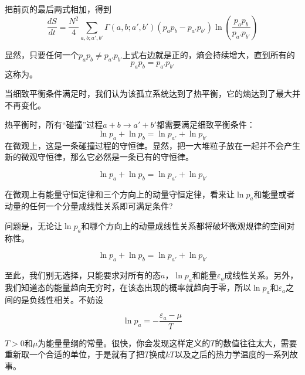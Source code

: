 \documentclass[CJK]{beamer}
\begin{document}
\begin{frame}
\bch
{\small
\bitem
\item{把前页的最后两式相加，得到
$$\frac{d S}{dt} =  \frac{N^2}{4} \sum_{a, b; a', b'}\Gamma(a, b; a', b') \left(p_ap_b - p_{a'}p_{b'}\right)\ln(\frac{p_ap_b}{p_{a'}p_{b'}})    $$
}
\eitem

显然，只要任何一个$p_ap_b\ne p_{a'}p_{b'}$上式右边就是正的，熵会持续增大，直到{\blue 所有的 
$$p_ap_b = p_{a'}p_{b'}$$}
这称为{。}

当细致平衡条件满足时，我们认为该孤立系统达到了热平衡，它的熵达到了最大并不再变化。
}

\ech
\end{frame}

\begin{frame}
\bch
{
热平衡时，所有“碰撞”过程$a+b \rightarrow a'+b'$都需要满足细致平衡条件：
$$\ln p_a + \ln p_b = \ln p_{a'} + \ln p_{b'}$$
在微观上，这是一条碰撞过程的守恒律。显然，把一大堆粒子放在一起并不会产生新的微观守恒律，那么它必然是一条已有的守恒律。

}
\ech
\end{frame}

\begin{frame}
\bch

$$\ln p_a + \ln p_b = \ln p_{a'} + \ln p_{b'}$$

\skipline

在微观上有能量守恒定律和三个方向上的动量守恒定律，看来让$\ln p_a$和能量或者动量的任何一个分量成线性关系即可满足条件?

\skipline

问题是，无论让$\ln p_a$和哪个方向上的动量成线性关系都将破坏{\blue 微观规律的空间对称性}。


\ech
\end{frame}

\begin{frame}
\bch

$$\ln p_a + \ln p_b = \ln p_{a'} + \ln p_{b'}$$

\skipline

至此，我们别无选择，只能要求对所有的态$a$，$\ln p_a$和能量$\varepsilon_a$成线性关系。另外，我们知道态的能量趋向无穷时，在该态出现的概率就趋向于零，所以$\ln p_a$和$\varepsilon_a$之间的是负线性相关。不妨设

$$\ln p_a = -\frac{\varepsilon_a - \mu}{T}$$

$T>0$和$\mu$为能量量纲的常量。很快，你会发现这样定义的$T$的数值往往太大，需要重新取一个合适的单位，于是就有了把$T$换成$kT$以及之后的热力学温度的一系列故事。
\ech
\end{frame}
\end{document}
